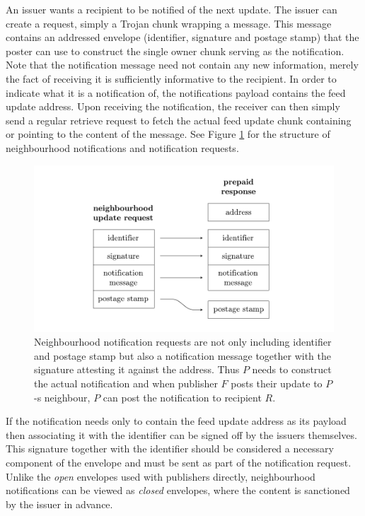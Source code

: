 An issuer wants a recipient to be notified of the next update. The issuer can create a  request, simply a Trojan chunk wrapping a message. This message contains an addressed envelope (identifier, signature and postage stamp) that the poster can use to construct the single owner chunk serving as the notification. Note that the notification message need not contain any new information, merely the fact of receiving it is sufficiently informative to the recipient. In order to indicate what it is a notification of, the notifications payload contains the feed update address. Upon receiving the notification, the receiver can then simply send a regular retrieve request to fetch the actual feed update chunk containing or pointing to the content of the message. See Figure \ref{fig:notification-from-neighbourhood} for the structure of neighbourhood notifications and notification requests.
                                

\begin{figure}[htbp]
\centering
\includegraphics[width=\textwidth]{fig/notification-from-neighbourhood.pdf}
\caption[Neighbourhood notifications \statusgreen]{Neighbourhood notification requests are not only including identifier and postage stamp but also a notification message together with the signature attesting it against the address. Thus $P$ needs to construct the actual notification and when publisher $F$ posts their update to $P$-s neighbour, $P$ can post the notification to recipient $R$.}
\label{fig:notification-from-neighbourhood}
\end{figure}

If the notification needs only to contain the feed update address as its payload then associating it with the identifier can be signed off by the issuers themselves. This signature together with the identifier should be considered a necessary component of the envelope and must be sent as part of the notification request.
Unlike the \emph{open} envelopes used with publishers directly, neighbourhood notifications can be viewed as \emph{closed} envelopes, where the content is sanctioned by the issuer in advance. 

